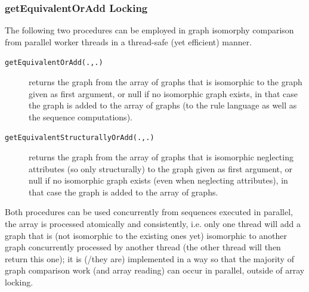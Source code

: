 \subsubsection*{getEquivalentOrAdd Locking}

The following two procedures can be employed in graph isomorphy comparison from parallel worker threads in a thread-safe (yet efficient) manner.

\begin{description}
\item[\texttt{getEquivalentOrAdd(.,.)}] returns the graph from the array of graphs 
  that is isomorphic to the graph given as first argument, or null if no isomorphic graph exists,
  in that case the graph is added to the array of graphs (to the rule language as well as the sequence computations).
\item[\texttt{getEquivalentStructurallyOrAdd(.,.)}] returns the graph from the array of graphs
  that is isomorphic neglecting attributes (so only structurally) to the graph given as first argument,
  or null if no isomorphic graph exists (even when neglecting attributes), in that case the graph is added to the array of graphs.
\end{description}
 
Both procedures can be used concurrently from sequences executed in parallel,
the array is processed atomically and consistently, i.e. only one thread will add a graph
that is (not isomorphic to the existing ones yet) isomorphic to another graph concurrently processed by another thread (the other thread will then return this one);
it is (/they are) implemented in a way so that the majority of graph comparison work (and array reading) can occur in parallel, outside of array locking.

